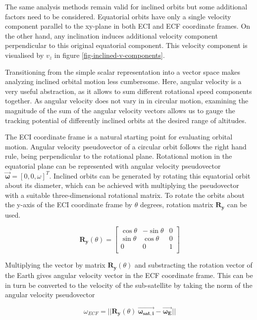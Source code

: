 \documentclass[english, 12pt, a4paper, elec, utf8, a-1b, online]{aaltothesis}
\begin{document}
The same analysis methods remain valid for inclined orbits but some additional factors need to be considered.
Equatorial orbits have only a single velocity component parallel to the xy-plane in both ECI and ECF coordinate frames.
On the other hand, any inclination induces additional velocity component perpendicular to this original equatorial component.
This velocity component is visualised by $v_z$ in figure \ref{fig-inclined-v-components}.

Transitioning from the simple scalar representation into a vector space makes analyzing inclined orbital motion less cumbersome.
Here, angular velocity is a very useful abstraction, as it allows to sum different rotational speed components together.
As angular velocity does not vary in in circular motion, examining the magnitude of the sum of the angular velocity vectors allows us to gauge the tracking potential of differently inclined orbits at the desired range of altitudes.

The ECI coordinate frame is a natural starting point for evaluating orbital motion.
Angular velocity pseudovector of a circular orbit follows the right hand rule, being perpendicular to the rotational plane.
Rotational motion in the equatorial plane can be represented with angular velocity pseudovector $\bm{\vec{\omega}} = [0,0,\omega]^T$.
Inclined orbits can be generated by rotating this equatorial orbit about its diameter, which can be achieved with multiplying the pseudovector with a suitable three-dimensional rotational matrix.
To rotate the orbits about the y-axis of the ECI coordinate frame by $\theta$ degrees, rotation matrix $\bm{R_y}$ can be used.

\begin{equation*}
  \bm{R_y}(\theta) = \begin{bmatrix}
    \cos \theta & -\sin \theta & 0 \\[3pt]
    \sin \theta &  \cos \theta & 0 \\[3pt]
    0           &  0           & 1 \\
    \end{bmatrix}
\end{equation*}

Multiplying the vector by matrix $\bm{R_y}(\theta)$ and substracting the rotation vector of the Earth gives angular velocity vector in the ECF coordinate frame.
This can be in turn be converted to the velocity of the sub-satellite by taking the norm of the angular velocity pseudovector

\begin{equation*}
  \omega_{ECF} =
  ||\bm{R_y}(\theta)\ \bm{\vec{\omega_{sat, i}}} - \bm{\vec{\omega_{E}}}||
\end{equation*}
\end{document}
